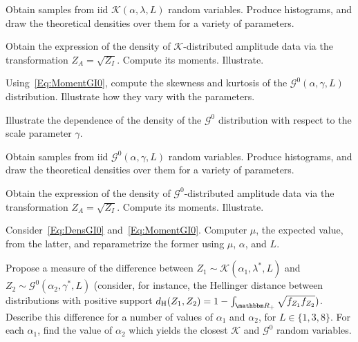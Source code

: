 \begin{exer}
Obtain samples from iid $\mathcal{K}(\alpha,\lambda,L)$ random variables.
Produce histograms, and draw the theoretical densities over them for a variety of parameters.
\end{exer}

\begin{exer}
Obtain the expression of the density of $\mathcal K$-distributed amplitude data via the transformation $Z_A=\sqrt{Z_I}$.
Compute its moments.
Illustrate.
\end{exer}

\begin{exer}
Using~\eqref{Eq:MomentGI0}, compute the skewness and kurtosis of the $\mathcal G^0(\alpha,\gamma,L)$ distribution.
Illustrate how they vary with the parameters.
\end{exer}

\begin{exer}
Illustrate the dependence of the density of the $\mathcal G^0$ distribution with respect to the scale parameter $\gamma$.
\end{exer}

\begin{exer}
Obtain samples from iid $\mathcal{G}^0(\alpha,\gamma,L)$ random variables.
Produce histograms, and draw the theoretical densities over them for a variety of parameters.
\end{exer}

\begin{exer}
Obtain the expression of the density of $\mathcal G^0$-distributed amplitude data via the transformation $Z_A=\sqrt{Z_I}$.
Compute its moments.
Illustrate.
\end{exer}

\begin{exer}
Consider~\eqref{Eq:DensGI0} and~\eqref{Eq:MomentGI0}.
Computer $\mu$, the expected value, from the latter, and reparametrize the former using $\mu$, $\alpha$, and $L$.
\end{exer}

\begin{exer}\label{Ex:ApproximationKGI0}
Propose a measure of the difference between $Z_1\sim\mathcal K(\alpha_1,\lambda^*, L)$ and $Z_2\sim\mathcal G^0(\alpha_2,\gamma^*, L)$ (consider, for instance, the Hellinger distance between distributions with positive support $d_{\text{H}}(Z_1,Z_2)=1-\int_{\mathbbm R_+}\sqrt{f_{Z_1} f_{Z_2}})$.
Describe this difference for a number of values of $\alpha_1$ and $\alpha_2$, for $L\in\{1,3,8\}$.
For each $\alpha_1$, find the value of $\alpha_2$ which yields the closest $\mathcal K$ and $\mathcal G^0$ random variables\cite{mejailfreryjacobobustos2001}.
\end{exer}

